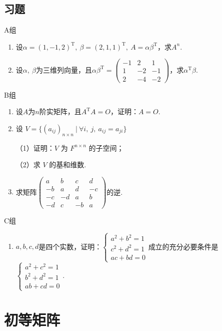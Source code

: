 \subsection{习题}
\centerline{\heiti A组}
\begin{enumerate}
	\item 设$\alpha=(1,-1,2)^\mathrm{T},\ \beta=(2,1,1)^\mathrm{T},\ A=\alpha\beta^\mathrm{T}$，求$A^n$.
	\item 设$\alpha,\ \beta$为三维列向量，且$\alpha\beta^\mathrm{T}=
	\begin{pmatrix}-1 & 2 & 1 \\ 1 & -2 & -1 \\ 2 & -4 & -2\end{pmatrix}
	$，求$\alpha^\mathrm{T}\beta$.
\end{enumerate}
\centerline{\heiti B组}
\begin{enumerate}
	\item 设$A$为$n$阶实矩阵，且$A^\mathrm{T}A=O$，证明：$A=O$.
	\item 设 $V=\{(a_{ij})_{n \times n}\ |\ \forall i,\ j,\ a_{ij}=a_{ji}\}$
	
	（1）证明：$V$ 为 $F^{n \times n}$ 的子空间；
	
	（2）求  $V$ 的基和维数.
	\item 求矩阵$\begin{pmatrix}
		a & b & c & d \\ -b & a & d & -c \\ -c & -d & a & b \\ -d & c & -b & a
	\end{pmatrix}$的逆.
\end{enumerate}

\centerline{\heiti C组}
\begin{enumerate}
	\item $a,b,c,d$是四个实数，证明：$\begin{cases}
		a^2+b^2=1 \\ c^2+d^2=1 \\ ac+bd=0
	\end{cases}$成立的充分必要条件是$\begin{cases}
		a^2+c^2=1 \\ b^2+d^2=1 \\ ab+cd=0
	\end{cases}$.
\end{enumerate}

\section{初等矩阵}
